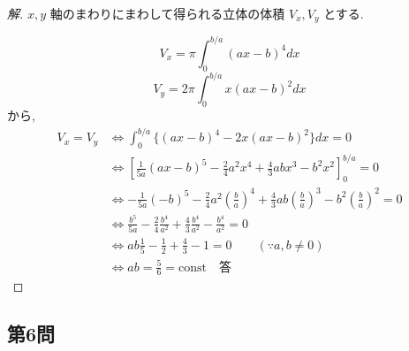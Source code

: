 \documentclass[../main.tex]{subfiles}
\begin{document}
\begin{proof}[解]
  $x, y$ 軸のまわりにまわして得られる立体の体積 $V_x, V_y$ とする.

  \begin{center}
  \end{center}

  \[ V_x = \pi \int_0^{b/a} (ax-b)^4 dx \]
  \[ V_y = 2\pi \int_0^{b/a} x(ax-b)^2 dx \]
  から,
  \begin{align*}
    V_x = V_y &\iff \int_0^{b/a} \{ (ax-b)^4 - 2x(ax-b)^2 \} dx = 0 \\
    &\iff \left[ \frac{1}{5a} (ax-b)^5 - \frac{2}{4}a^2 x^4 + \frac{4}{3}ab x^3 - b^2 x^2 \right]_0^{b/a} = 0 \\
    &\iff -\frac{1}{5a} (-b)^5 - \frac{2}{4}a^2 \left(\frac{b}{a}\right)^4 + \frac{4}{3}ab \left(\frac{b}{a}\right)^3 - b^2 \left(\frac{b}{a}\right)^2 = 0 \\
    &\iff \frac{b^5}{5a} - \frac{2}{4}\frac{b^4}{a^2} + \frac{4}{3}\frac{b^4}{a^2} - \frac{b^4}{a^2} = 0 \\
    &\iff ab\frac{1}{5} - \frac{1}{2} + \frac{4}{3} - 1 = 0 \qquad (\because a, b \neq 0) \\
    &\iff ab = \frac{5}{6} = \text{const} \quad \text{答}
  \end{align*}
\end{proof}

\newpage

\subsection*{第6問}
\end{document}
